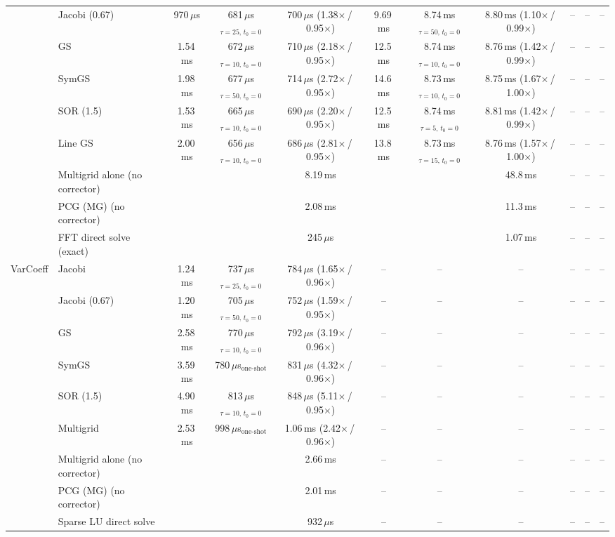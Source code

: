 {\begin{tabular}{llccccccccc}
 & Jacobi (0.67) & 970\,$\mu$s & 681\,$\mu$s$_{\tau{=}25,\,t_0{=}0}$ & 700\,$\mu$s (1.38$\times$\,/\,0.95$\times$) & 9.69\,ms & 8.74\,ms$_{\tau{=}50,\,t_0{=}0}$ & 8.80\,ms (1.10$\times$\,/\,0.99$\times$) & -- & -- & -- \\
 & GS & 1.54\,ms & 672\,$\mu$s$_{\tau{=}10,\,t_0{=}0}$ & 710\,$\mu$s (2.18$\times$\,/\,0.95$\times$) & 12.5\,ms & 8.74\,ms$_{\tau{=}10,\,t_0{=}0}$ & 8.76\,ms (1.42$\times$\,/\,0.99$\times$) & -- & -- & -- \\
 & SymGS & 1.98\,ms & 677\,$\mu$s$_{\tau{=}50,\,t_0{=}0}$ & 714\,$\mu$s (2.72$\times$\,/\,0.95$\times$) & 14.6\,ms & 8.73\,ms$_{\tau{=}10,\,t_0{=}0}$ & 8.75\,ms (1.67$\times$\,/\,1.00$\times$) & -- & -- & -- \\
 & SOR (1.5) & 1.53\,ms & 665\,$\mu$s$_{\tau{=}10,\,t_0{=}0}$ & 690\,$\mu$s (2.20$\times$\,/\,0.95$\times$) & 12.5\,ms & 8.74\,ms$_{\tau{=}5,\,t_0{=}0}$ & 8.81\,ms (1.42$\times$\,/\,0.99$\times$) & -- & -- & -- \\
 & Line GS & 2.00\,ms & 656\,$\mu$s$_{\tau{=}10,\,t_0{=}0}$ & 686\,$\mu$s (2.81$\times$\,/\,0.95$\times$) & 13.8\,ms & 8.73\,ms$_{\tau{=}15,\,t_0{=}0}$ & 8.76\,ms (1.57$\times$\,/\,1.00$\times$) & -- & -- & -- \\
 & Multigrid alone (no corrector) &  &  & 8.19\,ms &  &  & 48.8\,ms & -- & -- & -- \\
 & PCG (MG) (no corrector) &  &  & 2.08\,ms &  &  & 11.3\,ms & -- & -- & -- \\
 & FFT direct solve (exact) &  &  & 245\,$\mu$s &  &  & 1.07\,ms & -- & -- & -- \\
\midrule
VarCoeff & Jacobi & 1.24\,ms & 737\,$\mu$s$_{\tau{=}25,\,t_0{=}0}$ & 784\,$\mu$s (1.65$\times$\,/\,0.96$\times$) & -- & -- & -- & -- & -- & -- \\
 & Jacobi (0.67) & 1.20\,ms & 705\,$\mu$s$_{\tau{=}50,\,t_0{=}0}$ & 752\,$\mu$s (1.59$\times$\,/\,0.95$\times$) & -- & -- & -- & -- & -- & -- \\
 & GS & 2.58\,ms & 770\,$\mu$s$_{\tau{=}10,\,t_0{=}0}$ & 792\,$\mu$s (3.19$\times$\,/\,0.96$\times$) & -- & -- & -- & -- & -- & -- \\
 & SymGS & 3.59\,ms & 780\,$\mu$s$_{\text{one-shot}}$ & 831\,$\mu$s (4.32$\times$\,/\,0.96$\times$) & -- & -- & -- & -- & -- & -- \\
 & SOR (1.5) & 4.90\,ms & 813\,$\mu$s$_{\tau{=}10,\,t_0{=}0}$ & 848\,$\mu$s (5.11$\times$\,/\,0.95$\times$) & -- & -- & -- & -- & -- & -- \\
 & Multigrid & 2.53\,ms & 998\,$\mu$s$_{\text{one-shot}}$ & 1.06\,ms (2.42$\times$\,/\,0.96$\times$) & -- & -- & -- & -- & -- & -- \\
 & Multigrid alone (no corrector) &  &  & 2.66\,ms & -- & -- & -- & -- & -- & -- \\
 & PCG (MG) (no corrector) &  &  & 2.01\,ms & -- & -- & -- & -- & -- & -- \\
 & Sparse LU direct solve &  &  & 932\,$\mu$s & -- & -- & -- & -- & -- & -- \\
\bottomrule
\end{tabular}}
